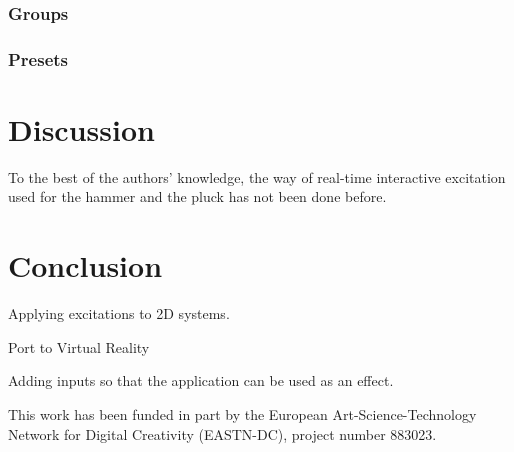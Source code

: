 \documentclass{article}
\begin{document}
\subsubsection{Groups}

\subsubsection{Presets}

\section{Discussion}
To the best of the authors' knowledge, the way of real-time interactive excitation used for the hammer and the pluck has not been done before. 

\section{Conclusion}

Applying excitations to 2D systems.

Port to Virtual Reality

Adding inputs so that the application can be used as an effect. 

\begin{acknowledgments}
This work has been funded in part by the European Art-Science-Technology Network for Digital Creativity (EASTN-DC), project number 883023.
\end{acknowledgments} 


\end{document}
